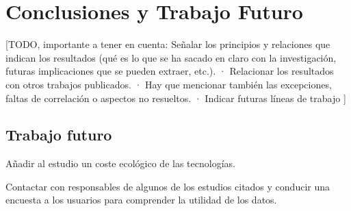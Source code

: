 \chapter{Conclusiones y Trabajo Futuro}
\label{cap:conclusiones}


[TODO, importante a tener en cuenta:
Señalar los principios y relaciones que indican los resultados (qué es lo que se ha sacado en claro con la investigación, futuras implicaciones que se pueden extraer, etc.).
· Relacionar los resultados con otros trabajos publicados.
· Hay que mencionar también las excepciones, faltas de correlación o aspectos no resueltos.
· Indicar futuras líneas de trabajo
]

\section*{Trabajo futuro}

Añadir al estudio un coste ecológico de las tecnologías.

Contactar con responsables de algunos de los estudios citados y conducir una encuesta a los usuarios para comprender la utilidad de los datos.